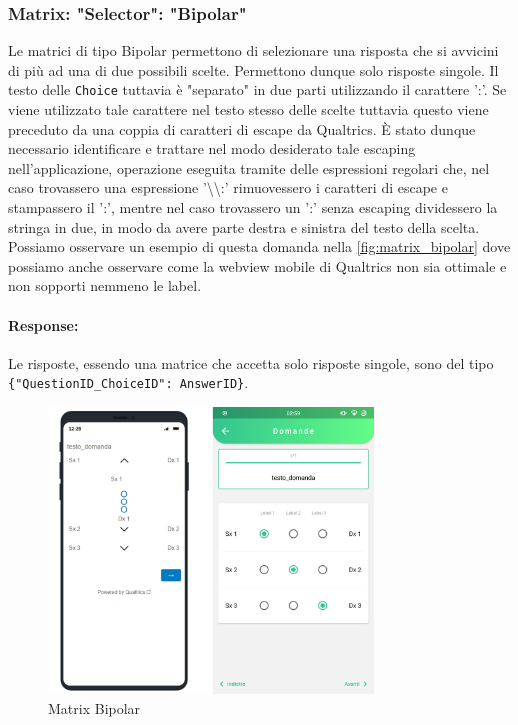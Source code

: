 \subsubsection{Matrix: "Selector": "Bipolar"}
Le matrici di tipo Bipolar permettono di selezionare una risposta che si avvicini di più ad una di due possibili scelte. Permettono dunque solo risposte singole. Il testo delle \texttt{Choice} tuttavia è "separato" in due parti utilizzando il carattere ':'. Se viene utilizzato tale carattere nel testo stesso delle scelte tuttavia questo viene preceduto da una coppia di caratteri di escape da Qualtrics. È stato dunque necessario identificare e trattare nel modo desiderato tale escaping nell'applicazione, operazione eseguita tramite delle espressioni regolari che, nel caso trovassero una espressione '\textbackslash\textbackslash:' rimuovessero i caratteri di escape e stampassero il ':', mentre nel caso trovassero un ':' senza escaping dividessero la stringa in due, in modo da avere parte destra e sinistra del testo della scelta. Possiamo osservare un esempio di questa domanda nella \autoref{fig:matrix_bipolar} dove possiamo anche osservare come la webview mobile di Qualtrics non sia ottimale e non sopporti nemmeno le label.

\paragraph{Response:}
Le risposte, essendo una matrice che accetta solo risposte singole, sono del tipo \texttt{\{"QuestionID\_ChoiceID": AnswerID\}}.

\begin{figure}[h!]
\centering
\includegraphics[width=0.77\textwidth]{img/matrix_bipolar}
\caption{Matrix Bipolar}
\label{fig:matrix_bipolar}
\end{figure}

